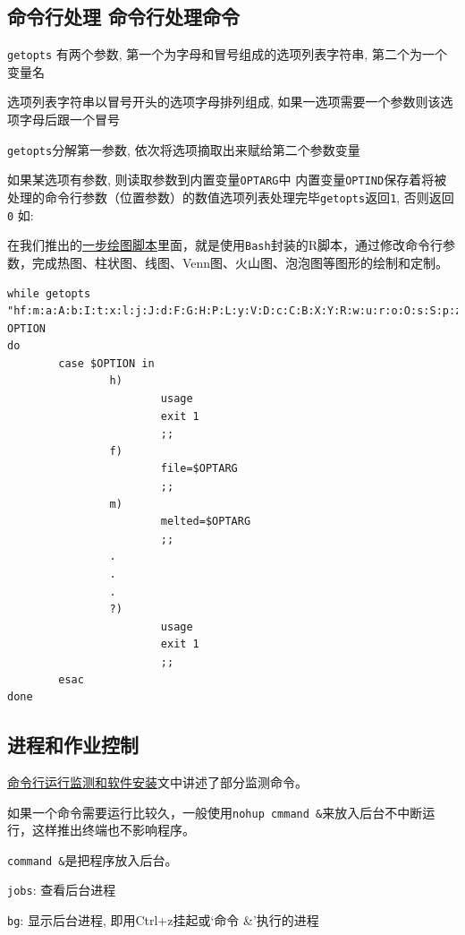 \documentclass[]{article}
\numberwithin{figure}{section}
\numberwithin{table}{section}
\begin{document}
\hypertarget{command_parameter}{%
\subsection{命令行处理 命令行处理命令}\label{command_parameter}}

\texttt{getopts} 有两个参数, 第一个为字母和冒号组成的选项列表字符串, 第二个为一个变量名

选项列表字符串以冒号开头的选项字母排列组成, 如果一选项需要一个参数则该选项字母后跟一个冒号

\texttt{getopts}分解第一参数, 依次将选项摘取出来赋给第二个参数变量

如果某选项有参数, 则读取参数到内置变量\texttt{OPTARG}中 内置变量\texttt{OPTIND}保存着将被处理的命令行参数（位置参数）的数值选项列表处理完毕\texttt{getopts}返回\texttt{1}, 否则返回\texttt{0} 如:

在我们推出的\href{https://mp.weixin.qq.com/s/bsvB1k17Izom2ldgdwXrdg}{一步绘图脚本}里面，就是使用\texttt{Bash}封装的R脚本，通过修改命令行参数，完成热图、柱状图、线图、Venn图、火山图、泡泡图等图形的绘制和定制。

\begin{verbatim}
while getopts "hf:m:a:A:b:I:t:x:l:j:J:d:F:G:H:P:L:y:V:D:c:C:B:X:Y:R:w:u:r:o:O:s:S:p:z:Z:v:e:E:i:" OPTION
do
        case $OPTION in
                h)
                        usage
                        exit 1
                        ;;
                f)
                        file=$OPTARG
                        ;;
                m)
                        melted=$OPTARG
						;;
				.
				.
				.
                ?)
                        usage
                        exit 1
                        ;;
        esac
done				
\end{verbatim}

\hypertarget{process_monitor}{%
\subsection{进程和作业控制}\label{process_monitor}}

\href{https://mp.weixin.qq.com/s/TNU7X2mhfVVffaJ7NRBuNA}{命令行运行监测和软件安装}文中讲述了部分监测命令。

如果一个命令需要运行比较久，一般使用\texttt{nohup\ cmmand\ \&}来放入后台不中断运行，这样推出终端也不影响程序。

\texttt{command\ \&}是把程序放入后台。

\texttt{jobs}: 查看后台进程

\texttt{bg}: 显示后台进程, 即用Ctrl+z挂起或`命令 \&'执行的进程
\end{document}
